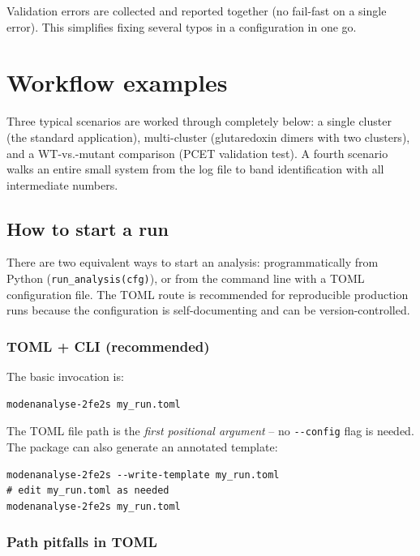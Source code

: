 \documentclass[11pt,a4paper,twoside]{article}
\theoremstyle{remark}
\begin{document}
Validation errors are collected and reported together (no
fail-fast on a single error). This simplifies fixing several
typos in a configuration in one go.

\section{Workflow examples}
\label{sec:workflow}

Three typical scenarios are worked through completely below: a
single cluster (the standard application), multi-cluster
(glutaredoxin dimers with two clusters), and a WT-vs.-mutant
comparison (PCET validation test). A fourth scenario walks an
entire small system from the log file to band identification with
all intermediate numbers.

\subsection{How to start a run}
\label{sec:workflow-how-to-start}

There are two equivalent ways to start an analysis: programmatically
from Python (\texttt{run\_analysis(cfg)}), or from the command line
with a TOML configuration file. The TOML route is recommended for
reproducible production runs because the configuration is
self-documenting and can be version-controlled.

\subsubsection*{TOML + CLI (recommended)}

The basic invocation is:

\begin{lstlisting}[style=bash]
modenanalyse-2fe2s my_run.toml
\end{lstlisting}

The TOML file path is the \emph{first positional argument} -- no
\texttt{-{}-config} flag is needed. The package can also generate
an annotated template:

\begin{lstlisting}[style=bash]
modenanalyse-2fe2s --write-template my_run.toml
# edit my_run.toml as needed
modenanalyse-2fe2s my_run.toml
\end{lstlisting}

\subsubsection*{Path pitfalls in TOML}
\end{document}
